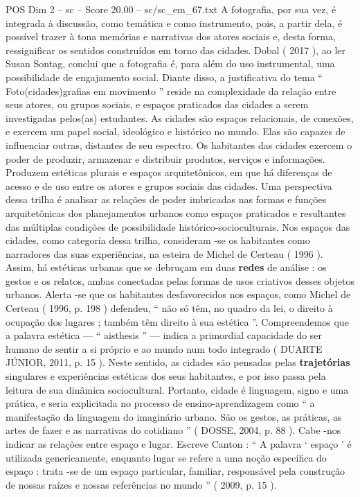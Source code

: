 \begin{textsample}{POS Dim 2 – sc – Score 20.00 – sc/sc\_em\_67.txt}
A fotografia, por sua vez, é integrada à discussão, como temática e como instrumento, pois, a partir dela, é possível trazer à tona memórias e narrativas dos atores sociais e, desta forma, ressignificar os sentidos construídos em torno das cidades.
Dobal ( 2017 ), ao ler Susan Sontag, conclui que a fotografia é, para além do uso instrumental, uma possibilidade de engajamento social.
Diante disso, a justificativa do tema “ Foto(cidades)grafias em movimento ” reside na complexidade da relação entre seus atores, ou grupos sociais, e espaços praticados das cidades a serem investigadas pelos(as) estudantes.
As cidades são espaços relacionais, de conexões, e exercem um papel social, ideológico e histórico no mundo.
Elas são capazes de influenciar outras, distantes de seu espectro.
Os habitantes das cidades exercem o poder de produzir, armazenar e distribuir produtos, serviços e informações.
Produzem estéticas plurais e espaços arquitetônicos, em que há diferenças de acesso e de uso entre os atores e grupos sociais das cidades.
Uma perspectiva dessa trilha é analisar as relações de poder imbricadas nas formas e funções arquitetônicas dos planejamentos urbanos como espaços praticados e resultantes das múltiplas condições de possibilidade histórico-socioculturais.
Nos espaços das cidades, como categoria dessa trilha, consideram -se os habitantes como narradores das suas experiências, na esteira de Michel de Certeau ( 1996 ).
Assim, há estéticas urbanas que se debruçam em duas \textbf{redes} de análise : os gestos e os relatos, ambas conectadas pelas formas de usos criativos desses objetos urbanos.
Alerta -se que os habitantes desfavorecidos nos espaços, como Michel de Certeau ( 1996, p. 198 ) defendeu, “ não só têm, no quadro da lei, o direito à ocupação dos lugares ; também têm direito à sua estética ”.
Compreendemos que a palavra estética — “ aisthesis ” — indica a primordial capacidade do ser humano de sentir a si próprio e ao mundo num todo integrado ( DUARTE JÚNIOR, 2011, p. 15 ).
Neste sentido, as cidades são pensadas pelas \textbf{trajetórias} singulares e experiências estéticas dos seus habitantes, e por isso passa pela leitura de sua dinâmica sociocultural.
Portanto, cidade é linguagem, signo e uma prática, e seria explicitada no processo de ensino-aprendizagem como “ a manifestação da linguagem do imaginário urbano.
São os gestos, as práticas, as artes de fazer e as narrativas do cotidiano ” ( DOSSE, 2004, p. 88 ).
Cabe -nos indicar as relações entre espaço e lugar.
Escreve Canton : “ A palavra ‘ espaço ’ é utilizada genericamente, enquanto lugar se refere a uma noção específica do espaço : trata -se de um espaço particular, familiar, responsável pela construção de nossas raízes e nossas referências no mundo ” ( 2009, p. 15 ).

\end{textsample}
